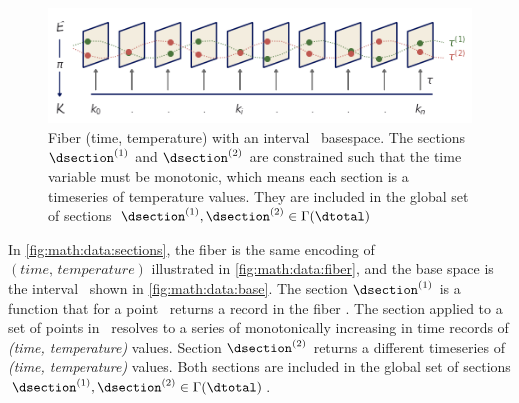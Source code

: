 \documentclass[../main.tex]{subfiles}
\begin{document}
\begin{figure}[H]
    \includegraphics[width=1\linewidth]{figures/math/fiberbundle.png}
    \caption{ Fiber (time, temperature) with an interval \dbase\ basespace. The sections $\dsection^{(1)}$ and $\dsection^{(2)}$ are constrained such that the time variable must be monotonic, which means each section is a timeseries of temperature values. They are included in the global set of sections  $\dsection^{(1)}, \dsection^{(2)} \in \Gamma(\dtotal)$}
    \label{fig:math:data:sections}
\end{figure}

In \autoref{fig:math:data:sections}, the fiber is the same encoding of $(time, \, temperature)$ illustrated in \autoref{fig:math:data:fiber}, and the base space is the interval \dbase\ shown in \autoref{fig:math:data:base}. The section $\dsection^{(1)}$ is a function that for a point \dbasepoint\ returns a record in the fiber \dfiber. The section applied to a set of points in \dbase\ resolves to a series of monotonically increasing in time records of \textit{(time, temperature)} values. Section $\dsection^{(2)}$ returns a different timeseries of \textit{(time, temperature)} values. Both sections are included in the global set of sections $\dsection^{(1)}, \dsection^{(2)} \in \Gamma(\dtotal)$.
\end{document}
